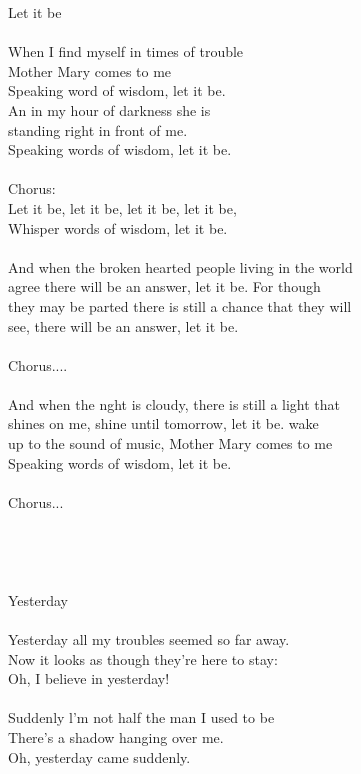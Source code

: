 Let it be \\
 \\
When I find myself in times of trouble \\
Mother Mary comes to me \\
Speaking word of wisdom, let it be. \\
An in my hour of darkness she is \\
standing right in front of me. \\
Speaking words of wisdom, let it be. \\
 \\
Chorus: \\
Let it be, let it be, let it be, let it be, \\
Whisper words of wisdom, let it be. \\
 \\
And when the broken hearted people living in the world \\
agree there will be an answer, let it be. For though \\
they may be parted there is still a chance that they will \\
see, there will be an answer, let it be. \\
 \\
Chorus.... \\
 \\
And when the nght is cloudy, there is still a light that \\
shines on me, shine until tomorrow, let it be. wake \\
up to the sound of music, Mother Mary comes to me \\
Speaking words of wisdom, let it be. \\
 \\
Chorus... \\
 \\
 \\
 \\
 \\
Yesterday \\
 \\
Yesterday all my troubles seemed so far away. \\
Now it looks as though they're here to stay: \\
Oh, I believe in yesterday! \\
 \\
Suddenly l'm not half the man I used to be \\
There's a shadow hanging over me. \\
Oh, yesterday came suddenly. \\
